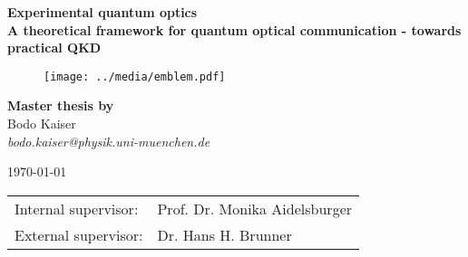 \makeatletter
\begin{titlepage}
	\begin{center}
		\large
		    \textbf{\textsf{Experimental quantum optics}}\\
	    \vspace{0.8em}
		\huge
	    \textbf{\textsf{A theoretical framework for quantum optical communication - towards  practical QKD}}\\
		
		\vspace{1.2em}
		\begin{figure}[htb]
			\centering
			\texttt{[image: ../media/emblem.pdf]}
		\end{figure}
		
		\vspace{.6em}
	    \large
	    \textbf{Master thesis by}\\
		\vspace{.8em}
	    \large
		Bodo Kaiser\\
	    \vspace{.2em}
		\textit{bodo.kaiser@physik.uni-muenchen.de}

	    \large
	    \today

	    \vspace{1.9em}
		\normalsize
		\begin{tabular}{ll}
		Internal supervisor: & Prof. Dr. Monika Aidelsburger \\
		External supervisor: & Dr. Hans H. Brunner \\
		\end{tabular}
	\end{center}
\end{titlepage}
\makeatother
